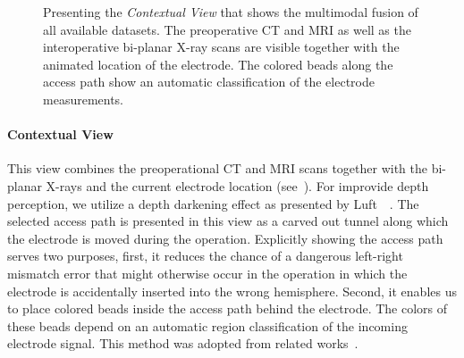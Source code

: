 \begin{figure}
\begin{subfigure}[b]{0.49\linewidth}
\end{subfigure}
\caption{Presenting the \emph{Contextual View} that shows the multimodal fusion of all available datasets. The preoperative CT and MRI as well as the interoperative bi-planar X-ray scans are visible together with the animated location of the electrode. The colored beads along the access path show an automatic classification of the electrode measurements.}
\label{contributions:medbio:dbs:contextual}
\end{figure}

\paragraph{Contextual View} This  view combines the preoperational CT and MRI scans together with the bi-planar X-rays and the current electrode location (see~). For improvide depth perception, we utilize a depth darkening effect as presented by Luft~\etal~\cite{luft2006image}. The selected access path is presented in this view as a carved out tunnel along which the electrode is moved during the operation. Explicitly showing the access path serves two purposes, first, it reduces the chance of a dangerous left-right mismatch error that might otherwise occur in the operation in which the electrode is accidentally inserted into the wrong hemisphere. Second, it enables us to place colored beads inside the access path behind the electrode. The colors of these beads depend on an automatic region classification of the incoming electrode signal. This method was adopted from related works~\cite{Haese2005, Miocinovic2007}.

